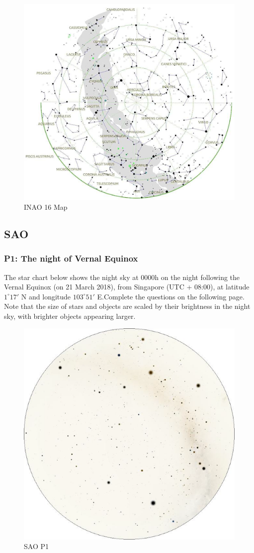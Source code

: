 \documentclass[a4paper,12pt]{extarticle}
\begin{document}
\begin{figure}[H]
    \centering
    \includegraphics[width=0.9\linewidth]{INAI_16.png}
    \caption{INAO 16 Map}
    \label{INAO16}
\end{figure}
\subsection{SAO}
\subsubsection{P1: The night of Vernal Equinox}
The star chart below shows the night sky at 0000h on the night following the Vernal Equinox (on 21 March 2018), from Singapore (UTC + 08:00), at latitude $1^\circ17'$ N and longitude $103^\circ51'$ E.Complete the questions on the following page. Note that the size of stars and objects are scaled by their brightness in the night sky, with brighter objects appearing larger.

\begin{figure}[H]
    \centering
    \includegraphics[width=0.9\linewidth]{SAO_1.png}
    \caption{SAO P1}
\end{figure}
\end{document}
